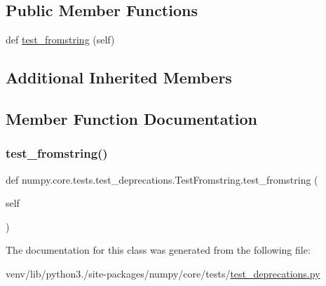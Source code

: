\subsection*{Public Member Functions}
\begin{DoxyCompactItemize}
\item 
def \hyperlink{classnumpy_1_1core_1_1tests_1_1test__deprecations_1_1TestFromstring_a2721b072e6c6f852cdb2d75fd3687778}{test\+\_\+fromstring} (self)
\end{DoxyCompactItemize}
\subsection*{Additional Inherited Members}


\subsection{Member Function Documentation}
\mbox{\label{classnumpy_1_1core_1_1tests_1_1test__deprecations_1_1TestFromstring_a2721b072e6c6f852cdb2d75fd3687778}} 
\subsubsection{\texorpdfstring{test\+\_\+fromstring()}{test\_fromstring()}}
{\footnotesize\ttfamily def numpy.\+core.\+tests.\+test\+\_\+deprecations.\+Test\+Fromstring.\+test\+\_\+fromstring (\begin{DoxyParamCaption}\item[{}]{self }\end{DoxyParamCaption})}



The documentation for this class was generated from the following file\+:\begin{DoxyCompactItemize}
\item 
venv/lib/python3./site-\/packages/numpy/core/tests/\hyperlink{core_2tests_2test__deprecations_8py}{test\+\_\+deprecations.\+py}\end{DoxyCompactItemize}
